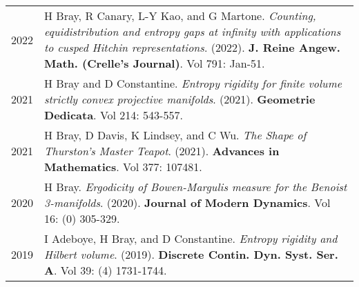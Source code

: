 
    \medskip


    \medskip
    
    \begin{center}
    {
    \renewcommand{\arraystretch}{1.5}
    \begin{longtable}{p{}  p{}}
    
2022 & 
        H Bray, R Canary, L-Y Kao, and G Martone. \textit{Counting, equidistribution and entropy gaps at infinity with applications to cusped Hitchin representations}. (2022). 
        \textbf{J. Reine Angew. Math. (Crelle's Journal)}. Vol 791: Jan-51.\\ 

2021 & 
        H Bray and D Constantine. \textit{Entropy rigidity for finite volume strictly convex projective manifolds}. (2021). 
        \textbf{Geometrie Dedicata}. Vol 214: 543-557.\\ 

2021 & 
        H Bray, D Davis, K Lindsey, and C Wu. \textit{The Shape of Thurston's Master Teapot}. (2021). 
        \textbf{Advances in Mathematics}. Vol 377: 107481.\\ 

2020 & 
        H Bray. \textit{Ergodicity of Bowen-Margulis measure for the Benoist 3-manifolds}. (2020). 
        \textbf{Journal of Modern Dynamics}. Vol 16: (0) 305-329.\\ 

2019 & 
        I Adeboye, H Bray, and D Constantine. \textit{Entropy rigidity and Hilbert volume}. (2019). 
        \textbf{Discrete Contin. Dyn. Syst. Ser. A}. Vol 39: (4) 1731-1744.
    \end{longtable}
    } 
    \end{center}

    \vspace{-1em}
    